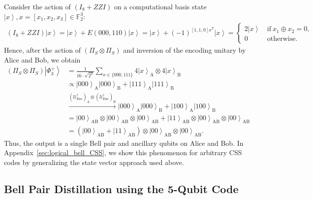\documentclass[journal,onecolumn]{IEEEtran}
\newcommand{\dket}[1]{\left\lvert #1 \right\rangle}
\begin{document}
Consider the action of $(I_8 + ZZI)$ on a computational basis state $\dket{x}, x = [x_1,x_2,x_3] \in \mathbb{F}_2^3$: 
\begin{align}
(I_8 + ZZI) \dket{x} = \dket{x} + E(000,110) \dket{x} = \dket{x} + (-1)^{[1,1,0] x^T} \dket{x} = 
\begin{cases}
2 \dket{x} & \ \text{if}\ x_1 \oplus x_2 = 0, \\
0          & \ \text{otherwise}.
\end{cases}
\end{align}
Hence, after the action of $(\Pi_S \otimes \Pi_S)$ and inversion of the encoding unitary by Alice and Bob, we obtain
\begin{align}
(\Pi_S \otimes \Pi_S) \dket{\Phi_3^+} & = \frac{1}{16 \cdot \sqrt{2^3}} \sum_{x \in \{000,111\}} 4\dket{x}_{\text{A}} \otimes 4\dket{x}_{\text{B}} \\
%
  & \propto \dket{000}_{\text{A}} \dket{000}_{\text{B}} + \dket{111}_{\text{A}} \dket{111}_{\text{B}} \\
%
  & \xrightarrow{(\mathcal{U}_{\text{Enc}}^{\dagger})_{\text{A}} \otimes (\mathcal{U}_{\text{Enc}}^{\dagger})_{\text{B}}} \dket{000}_{\text{A}} \dket{000}_{\text{B}} + \dket{100}_{\text{A}} \dket{100}_{\text{B}} \\
%
  & = \dket{00}_{\text{AB}} \otimes \dket{00}_{\text{AB}} \otimes \dket{00}_{\text{AB}} + \dket{11}_{\text{AB}} \otimes \dket{00}_{\text{AB}} \otimes \dket{00}_{\text{AB}} \\
%
  & = \left( \dket{00}_{\text{AB}} + \dket{11}_{\text{AB}} \right) \otimes \dket{00}_{\text{AB}} \otimes \dket{00}_{\text{AB}}.
\end{align}
Thus, the output is a single Bell pair and ancillary qubits on Alice and Bob.
In Appendix~\ref{sec:logical_bell_CSS}, we show this phenomenon for arbitrary CSS codes by generalizing the state vector approach used above.


\subsection{Bell Pair Distillation using the 5-Qubit Code}
\end{document}
